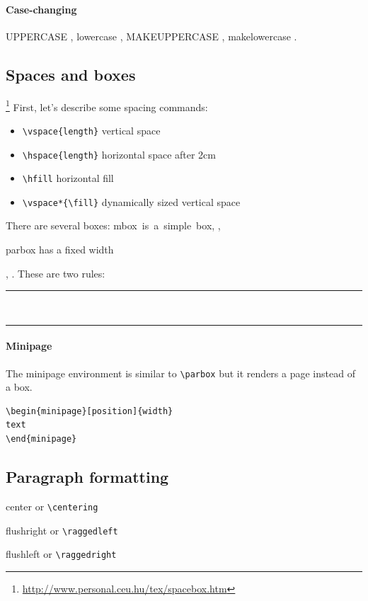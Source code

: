 \paragraph{Case-changing}
\uppercase{UpperCase \pagename}, \lowercase{LowerCase \pagename},
\MakeUppercase{MakeUppercase \pagename}, \MakeLowercase{MakeLowercase \pagename}.

\subsection{Spaces and boxes}
\footnote{\url{http://www.personal.ceu.hu/tex/spacebox.htm}}
First, let's describe some spacing commands:
\begin{itemize}
\item \lstinline$\vspace{length}$ vertical space
\item \lstinline$\hspace{length}$ horizontal space \hspace{2cm} after 2cm
\item \lstinline$\hfill$ horizontal fill
\item \lstinline$\vspace*{\fill}$ dynamically sized vertical space
\end{itemize}

There are several boxes:
\mbox{mbox is a simple box},
,
\parbox{2cm}{parbox has a fixed width},
.
These are two rules:
\rule{5mm}{2mm}
\hfill \\
\rule{\linewidth}{0.3mm}

\paragraph{Minipage}
The minipage environment is similar to \lstinline$\parbox$ but it renders a page
instead of a box.

\begin{minipage}[b]{0.5\linewidth}
\begin{lstlisting}
\begin{minipage}[position]{width}
text
\end{minipage}
\end{lstlisting}
\end{minipage}

\subsection{Paragraph formatting}
\begin{center}
center or \lstinline$\centering$
\end{center}
\begin{flushright}
flushright or \lstinline$\raggedleft$
\end{flushright}
\begin{flushleft}
flushleft or \lstinline$\raggedright$
\end{flushleft}


